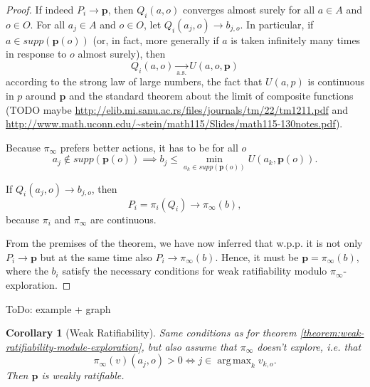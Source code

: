 \documentclass{article}
\DeclareMathOperator*{\argmax}{arg\,max}
\newtheorem{corollary}[thm]{Corollary}
\begin{document}
\begin{proof}
If indeed $P_i \rightarrow \mathbf{p}$, then $Q_i(a,o)$ converges almost surely for all $a\in A$ and $o\in O$. For all $a_j\in A$ and $o\in O$, let $Q_i(a_j,o) \rightarrow b_{j,o}$. In particular, if $a\in supp(\mathbf{p}(o))$ (or, in fact, more generally if $a$ is taken infinitely many times in response to $o$ almost surely), then
\begin{equation}
Q_i(a,o)\underset{\text{a.s.}}{\rightarrow} U(a,o,\mathbf{p})
\end{equation}
according to the strong law of large numbers, the fact that $U(a,p)$ is continuous in $p$ around $\mathbf{p}$ and the standard theorem about the limit of composite functions (TODO maybe \url{http://elib.mi.sanu.ac.rs/files/journals/tm/22/tm1211.pdf} and \url{http://www.math.uconn.edu/~stein/math115/Slides/math115-130notes.pdf}).

Because $\pi_\infty$ prefers better actions, it has to be for all $o$
\begin{equation}
a_j\notin supp(\mathbf{p}(o)) \implies b_j \leq \min_{a_k\in supp (\mathbf{p}(o)) } U(a_k,\mathbf{p}(o)).
\end{equation}

If $Q_i(a_j,o)\rightarrow b_{j,o}$, then
\begin{equation}
P_i=\pi_i(Q_i)\rightarrow \pi_\infty (b),
\end{equation}
because $\pi_i$ and $\pi_\infty$ are continuous.

From the premises of the theorem, we have now inferred that w.p.p. it is not only $P_i\rightarrow \mathbf{p}$ but at the same time also $P_i\rightarrow \pi_\infty (b)$. Hence, it must be $\mathbf{p}=\pi_\infty(b)$, where the $b_i$ satisfy the necessary conditions for weak ratifiability modulo $\pi_\infty$-exploration.


\end{proof}

ToDo: example + graph

\begin{corollary}[Weak Ratifiability]
Same conditions as for theorem \ref{theorem:weak-ratifiability-module-exploration}, but also assume that $\pi_\infty$ doesn't explore, i.e. that
\begin{equation}
\pi_\infty(v)(a_j,o) >0 \iff j\in \argmax_k v_{k, o}.
\end{equation}
Then $\mathbf{p}$ is weakly ratifiable.
\end{corollary}
\end{document}

